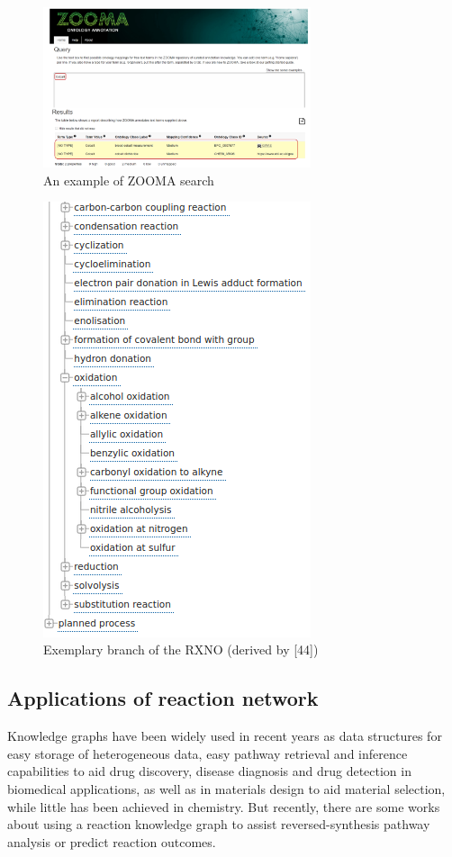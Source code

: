 \documentclass[%
 aip,
 jmp,%
 amsmath,amssymb,
 reprint,%
]{revtex4-2}
\begin{document}
\begin{figure}[htbp]
 \centering
 \includegraphics[width=0.7\textwidth]{figure/10.png}
 \caption{ An example of ZOOMA search }
 \label{ Fig.10 }
\end{figure}

\begin{figure}[htbp]
 \centering
 \includegraphics[width=0.7\textwidth]{figure/11.png}
 \caption{ Exemplary branch of the RXNO (derived by [44])}
 \label{ Fig.11 }
\end{figure}

\subsection{Applications of reaction network}
Knowledge graphs have been widely used in recent years as data structures for easy storage of 
heterogeneous data, easy pathway retrieval and inference capabilities to aid drug discovery, 
disease diagnosis and drug detection in biomedical applications, as well as in materials design to 
aid material selection, while little has been achieved in chemistry. But recently, there are some works 
about using a reaction knowledge graph to assist reversed-synthesis pathway analysis or predict reaction outcomes.
\end{document}
